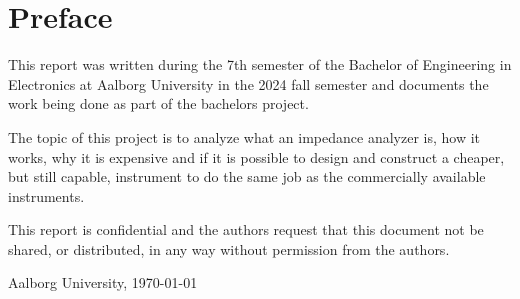 \thispagestyle{empty}
\chapter*{Preface}\label{ch:preface}

This report was written during the 7th semester of the Bachelor of Engineering in Electronics at Aalborg University in the 2024 fall semester and documents the work being done as part of the bachelors project.

The topic of this project is to analyze what an impedance analyzer is, how it works, why it is expensive and if it is possible to design and construct a cheaper, but still capable, instrument to do the same job as the commercially available instruments.

This report is confidential and the authors request that this document not be shared, or distributed, in any way without permission from the authors.

\vspace{\baselineskip}\hfill Aalborg University, \today


